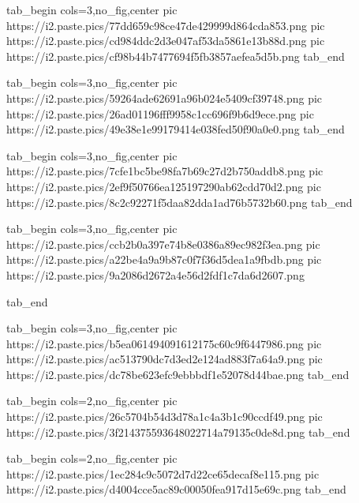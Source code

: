  
 
 
 
 
\zzSecCmtScr

\ifcmt
  tab_begin cols=3,no_fig,center
     pic https://i2.paste.pics/77dd659c98ce47de429999d864cda853.png
		 pic https://i2.paste.pics/cd984ddc2d3e047af53da5861e13b88d.png
		 pic https://i2.paste.pics/cf98b44b7477694f5fb3857aefea5d5b.png
  tab_end
\fi

\ifcmt
  tab_begin cols=3,no_fig,center
		pic https://i2.paste.pics/59264ade62691a96b024e5409cf39748.png
		pic https://i2.paste.pics/26ad01196fff9958c1cc696f9b6d9ece.png
		pic https://i2.paste.pics/49e38e1e99179414e038fed50f90a0e0.png
  tab_end
\fi

\ifcmt
  tab_begin cols=3,no_fig,center
		pic https://i2.paste.pics/7cfe1bc5be98fa7b69c27d2b750addb8.png
		pic https://i2.paste.pics/2ef9f50766ea125197290ab62cdd70d2.png
		pic https://i2.paste.pics/8c2c92271f5daa82dda1ad76b5732b60.png
  tab_end
\fi

\ifcmt
  tab_begin cols=3,no_fig,center
		pic https://i2.paste.pics/ccb2b0a397e74b8e0386a89ec982f3ea.png
		pic https://i2.paste.pics/a22be4a9a9b87c0f7f36d5dea1a9fbdb.png
		pic https://i2.paste.pics/9a2086d2672a4e56d2fdf1c7da6d2607.png

  tab_end
\fi

\ifcmt
  tab_begin cols=3,no_fig,center
		 pic https://i2.paste.pics/b5ea061494091612175c60c9f6447986.png
		 pic https://i2.paste.pics/ac513790dc7d3ed2e124ad883f7a64a9.png
		 pic https://i2.paste.pics/dc78be623efc9ebbbdf1e52078d44bae.png
  tab_end
\fi

\ifcmt
  tab_begin cols=2,no_fig,center
		pic https://i2.paste.pics/26c5704b54d3d78a1c4a3b1c90ccdf49.png
		pic https://i2.paste.pics/3f214375593648022714a79135c0de8d.png
  tab_end
\fi

\ifcmt
  tab_begin cols=2,no_fig,center
		pic https://i2.paste.pics/1ec284c9c5072d7d22ce65decaf8e115.png
		pic https://i2.paste.pics/d4004cce5ac89c00050fea917d15e69c.png
  tab_end
\fi
